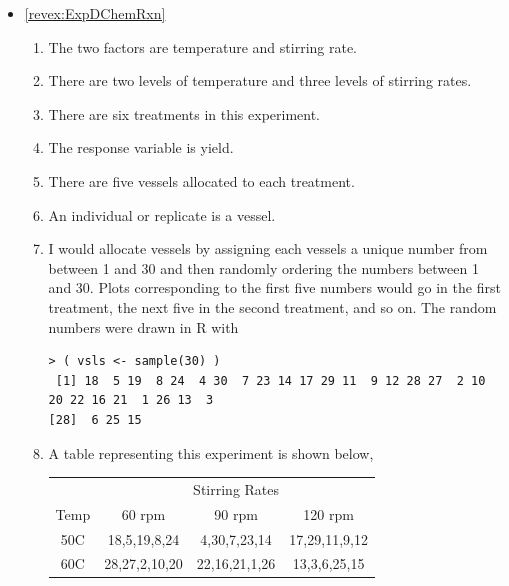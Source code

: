 \documentclass[10pt,openany]{book}\usepackage[]{graphicx}\usepackage[]{color}
\makeatletter
\newenvironment{kframe}{%
 \def\at@end@of@kframe{}%
 \ifinner\ifhmode%
  \def\at@end@of@kframe{\end{minipage}}%
  \begin{minipage}{\columnwidth}%
 \fi\fi%
 \def\FrameCommand##1{\hskip\@totalleftmargin \hskip-\fboxsep
 \colorbox{shadecolor}{##1}\hskip-\fboxsep
     \hskip-\linewidth \hskip-\@totalleftmargin \hskip\columnwidth}%
 \MakeFramed {\advance\hsize-\width
   \@totalleftmargin\z@ \linewidth\hsize
   \@setminipage}}%
 {\par\unskip\endMakeFramed%
 \at@end@of@kframe}
\newenvironment{knitrout}{}{} %
\makeatother
\begin{document}
\begin{itemize}
  \item \hypertarget{ans:ExpDChemRxn}{\ref{revex:ExpDChemRxn}}
    \begin{enumerate}
      \item The two factors are temperature and stirring rate.
      \item There are two levels of temperature and three levels of stirring rates.
      \item There are six treatments in this experiment.
      \item The response variable is yield.
      \item There are five vessels allocated to each treatment.
      \item An individual or replicate is a vessel.
      \item I would allocate vessels by assigning each vessels a unique number from between 1 and 30 and then randomly ordering the numbers between 1 and 30.  Plots corresponding to the first five numbers would go in the first treatment, the next five in the second treatment, and so on.  The random numbers were drawn in R with
\begin{knitrout}
\color{fgcolor}\begin{kframe}
\begin{verbatim}
> ( vsls <- sample(30) )
 [1] 18  5 19  8 24  4 30  7 23 14 17 29 11  9 12 28 27  2 10 20 22 16 21  1 26 13  3
[28]  6 25 15
\end{verbatim}
\end{kframe}
\end{knitrout}
      \item A table representing this experiment is shown below,

\begin{tabular}{cc|c|c}
 & \multicolumn{3}{c}{Stirring Rates} \\
\cline{2-4}
Temp & 60 rpm & 90 rpm & 120 rpm  \\
\cline{2-4}
\multicolumn{1}{c|}{50C} & 18,5,19,8,24 & 4,30,7,23,14 & \multicolumn{1}{c|}{17,29,11,9,12} \\
\hline
\multicolumn{1}{c|}{60C} & 28,27,2,10,20 & 22,16,21,1,26 & \multicolumn{1}{c|}{13,3,6,25,15} \\
\cline{2-4}
\end{tabular}
    \end{enumerate}


\end{itemize}
\end{document}
